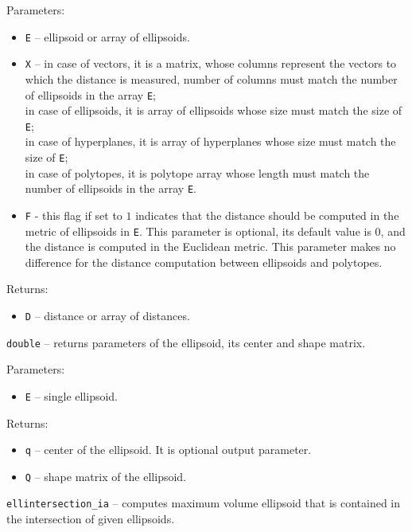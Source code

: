 Parameters:
\begin{itemize}
\item {\tt E} -- ellipsoid or array of ellipsoids.
\item {\tt X} -- in case of vectors, it is a matrix, whose columns represent
the vectors to which the distance is measured, number of columns must match
the number of ellipsoids in the array {\tt E};\\
in case of ellipsoids, it is array of ellipsoids whose size must match the
size of {\tt E};\\
in case of hyperplanes, it is array of hyperplanes whose size must match the
size of {\tt E};\\
in case of polytopes, it is polytope array whose length must match
the number of ellipsoids in the array {\tt E}.
\item {\tt F} - this flag if set to $1$ indicates that the distance should
be computed in the metric of ellipsoids in {\tt E}. This parameter is optional,
its default value is $0$, and the distance is computed in the Euclidean metric.
This parameter makes no difference for the distance computation
between ellipsoids and polytopes.
\end{itemize}

Returns:
\begin{itemize}
\item {\tt D} -- distance or array of distances.
\end{itemize}



\newpage

{\Large {\tt double}} -- returns parameters of the ellipsoid, its center
and shape matrix.

Parameters:
\begin{itemize}
\item {\tt E} -- single ellipsoid.
\end{itemize}

Returns:
\begin{itemize}
\item {\tt q} -- center of the ellipsoid. It is optional output parameter.
\item {\tt Q} -- shape matrix of the ellipsoid.
\end{itemize}

\newpage
{\Large {\tt ellintersection\_ia}} -- computes maximum volume ellipsoid that is
contained in the intersection of given ellipsoids.

